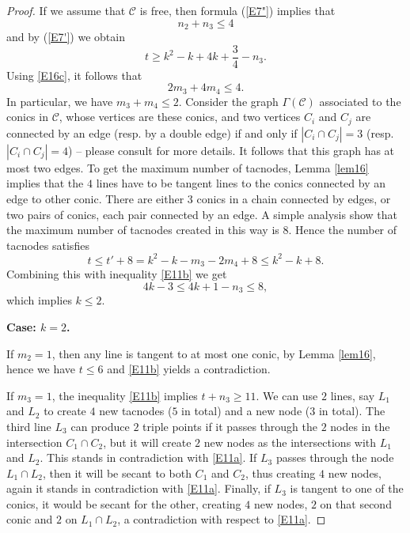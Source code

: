 \documentclass[12pt]{amsart}
\theoremstyle{plain}
\theoremstyle{definition}
\numberwithin{equation}{section}
\newcommand{\CC}{{\mathcal C}}
\begin{document}
\begin{proof}
If we assume that $\CC$ is free, then formula (\ref{E7"}) implies that
\begin{equation}
\label{E11a}
n_2+ n_3 \leq 4
\end{equation}
and by (\ref{E7'}) we obtain 
\begin{equation}
\label{E11b}
t \geq k^2-k+4k + \frac{3}{4} - n_3.
\end{equation}
Using \eqref{E16c}, it follows that
\begin{equation}
\label{E11b1}
2m_3+4m_4 \leq 4.
\end{equation}
In particular, we have $m_3+m_4 \leq 2$. Consider the graph $\Gamma(\CC)$ associated to the conics in $\CC$, whose vertices are these conics, and two vertices $C_i$ and $C_j$ are connected by an edge (resp. by a double edge) if and only if $|C_i \cap C_j|=3$ (resp.
$|C_i \cap C_j|=4$) -- please consult \cite{Meg} for more details. It follows that this graph has at most two edges. To get the maximum number of tacnodes, Lemma \ref{lem16} implies that the $4$ lines have to be tangent lines to the conics connected by an edge to other conic. There are either $3$ conics in a chain connected by edges, or two pairs of conics, each pair connected by an edge.
A simple analysis show that the maximum number of tacnodes created in this way is $8$. Hence the number of tacnodes satisfies
\begin{equation}
\label{E11b1'}
t \leq t'+8=k^2-k-m_3-2m_4+8 \leq k^2-k+8.
\end{equation}
Combining this with inequality \eqref{E11b} we get
$$4k-3 \leq 4k+1-n_3 \leq 8, $$
which implies $k \leq 2$. 
\medskip

{\bf Case: $k=2$.}

\medskip

If $m_2=1$, then any line is tangent to at most one conic, by  Lemma \ref{lem16}, hence we have $t \leq 6$ and \eqref{E11b} yields a contradiction.

If $m_3=1$, the inequality \eqref{E11b} implies $t + n_3 \geq 11$.
We can use $2$ lines, say $L_1$ and $L_2$ to create $4$ new tacnodes ($5$ in total) and a new node ($3$ in total). The third line $L_3$ can produce $2$ triple points if it passes through the $2$ nodes in the intersection $C_1 \cap C_2$, but it will create $2$ new nodes as the intersections with $L_1$ and $L_2$. This stands in contradiction with \eqref{E11a}. If $L_3$ passes through the node $L_1\cap L_2$, then it will be secant to both $C_1$ and $C_2$, thus creating $4$ new nodes, again it stands in contradiction with \eqref{E11a}.
Finally, if $L_3$ is tangent to one of the conics, it would be secant for the other, creating $4$ new nodes, $2$ on that second conic and $2$ on $L_1 \cap L_2$, a contradiction with respect to \eqref{E11a}.


\end{proof}
\end{document}
